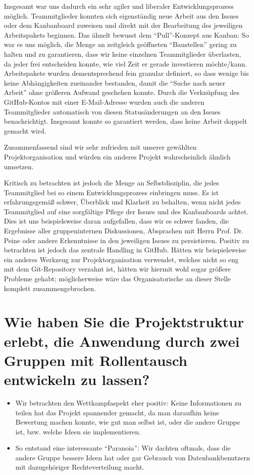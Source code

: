 \documentclass[12pt,DIV14,BCOR10mm,a4paper,parskip=half-,headsepline,headinclude,english,ngerman,bibliography=totocnumbered]{scrreprt}
\begin{document}
Insgesamt war uns dadurch ein sehr agiler und liberaler Entwicklungsprozess möglich.
Teammitglieder konnten sich eigenständig neue Arbeit aus den Issues oder dem Kanbanboard zuweisen und direkt mit der Bearbeitung des jeweiligen Arbeitspakets beginnen. Das ähnelt bewusst dem \enquote{Pull}-Konzept aus Kanban: So war es uns möglich, die Menge an zeitgleich geöffneten \enquote{Baustellen} gering zu halten und zu garantieren, dass wir keine einzelnen Teammitglieder überlasten, da jeder frei entscheiden konnte, wie viel Zeit er gerade investieren möchte/kann.
Arbeitspakete wurden dementsprechend fein granular definiert, so dass wenige bis keine Abhängigkeiten zueinander bestanden, damit die \enquote{Suche nach neuer Arbeit} ohne größeren Aufwand geschehen konnte.
Durch die Verknüpfung des GitHub-Kontos mit einer E-Mail-Adresse wurden auch die anderen Teammitglieder automatisch von diesen Statusänderungen an den Issues benachrichtigt.
Insgesamt konnte so garantiert werden, dass keine Arbeit doppelt gemacht wird.

Zusammenfassend sind wir sehr zufrieden mit unserer gewählten Projektorganisation und würden ein anderes Projekt wahrscheinlich ähnlich umsetzen.

Kritisch zu betrachten ist jedoch die Menge an Selbstdisziplin, die jedes Teammitglied bei so einem Entwicklungsprozess einbringen muss.
Es ist erfahrungsgemäß schwer, Überblick und Klarheit zu behalten, wenn nicht jedes Teammitglied auf eine sorgfältige Pflege der Issues und des Kanbanboards achtet.
Dies ist uns beispielsweise daran aufgefallen, dass wir es schwer fanden, die Ergebnisse aller gruppeninternen Diskussionen, Absprachen mit Herrn Prof. Dr. Peine oder andere Erkenntnisse in den jeweiligen Issues zu persistieren.
Positiv zu betrachten ist jedoch das zentrale Handling in GitHub. Hätten wir beispielsweise ein anderes Werkzeug zur Projektorganisation verwendet, welches nicht so eng mit dem Git-Repository verzahnt ist, hätten wir hiermit wohl sogar größere Probleme gehabt; möglicherweise wäre das Organisatorische an dieser Stelle komplett zusammengebrochen.

\section{Wie haben Sie die Projektstruktur erlebt, die Anwendung durch zwei Gruppen mit Rollentausch entwickeln zu lassen?}

\begin{itemize}
  \item Wir betrachten den Wettkampfaspekt eher positiv: Keine Informationen zu teilen hat das Projekt spannender gemacht, da man daraufhin keine Bewertung machen konnte, wie gut man selbst ist, oder die andere Gruppe ist, bzw. welche Ideen sie implementieren.
  \item So entstand eine interessante \enquote{Paranoia}: Wir dachten oftmals, dass die andere Gruppe bessere Ideen hat oder gar Gebrauch von Datenbankbenutzern mit dazugehöriger Rechteverteilung macht.
\end{itemize}
\end{document}

